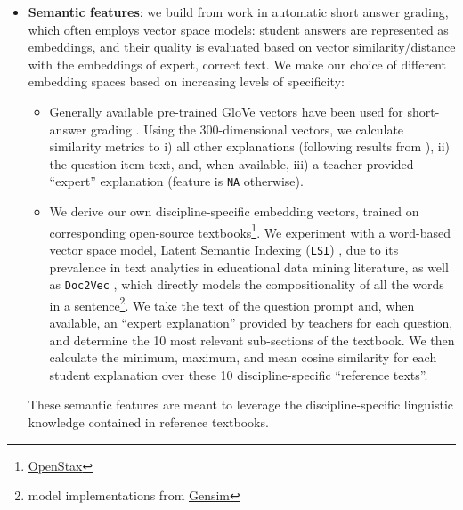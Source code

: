 \documentclass[notitlepage,12pt]{jedm}
\begin{document}
\begin{itemize}
	\item \textbf{Semantic features}: we build from work in automatic short answer 
	grading, which often employs vector space models: student answers are 
	represented as embeddings, and their quality is evaluated based on vector 
	similarity/distance with the embeddings of expert, correct text.
	We make our choice of different embedding spaces based on increasing levels 
	of specificity:  
	\begin{itemize}
		\item Generally available pre-trained GloVe 
		vectors \cite{pennington_glove:_2014} have been used for short-answer 
		grading \cite{magooda_vector_2016,riordan_investigating_2017}. 
		Using the 300-dimensional vectors, we calculate similarity metrics to 
		i) all other explanations (following results from 
		), 
		ii) the question item text, and, when available, 
		iii) a teacher provided ``expert'' explanation (feature is \verb|NA| 
		otherwise).
		\item We derive our own discipline-specific embedding vectors, trained 
		on corresponding open-source 
		textbooks\footnote{\href{https://openstax.org}{OpenStax}}. 
		We experiment with a word-based vector space model, Latent Semantic 
		Indexing (\verb|LSI|) \cite{deerwester_indexing_1990}, due to its 
		prevalence in text analytics in educational data mining literature, as 
		well as \verb|Doc2Vec| \cite{le_distributed_2014}, which directly 
		models the compositionality of all the words in a 
		sentence\footnote{model implementations from 
		\href{https://radimrehurek.com/gensim/index.html}{Gensim}}.
		We take the text of the question prompt and, when available, an 
		``expert explanation'' provided by teachers for each question, and 
		determine the 10 most relevant sub-sections of the textbook.
		We then calculate the minimum, maximum, 
		and mean cosine similarity for each student explanation over
                these 10 discipline-specific ``reference texts''.
	\end{itemize}

	These semantic features are meant to leverage the discipline-specific 
	linguistic knowledge contained in reference textbooks.  
		
	

\end{itemize}
\end{document}

